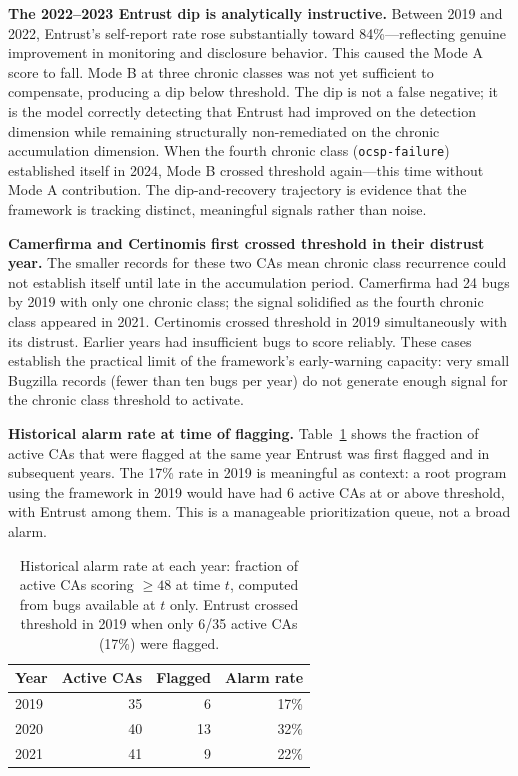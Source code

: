 \documentclass[10pt,twocolumn,letterpaper]{article}
\begin{document}
\textbf{The 2022--2023 Entrust dip is analytically instructive.} Between 2019 and 2022,
Entrust's self-report rate rose substantially toward 84\%---reflecting genuine improvement
in monitoring and disclosure behavior. This caused the Mode A score to fall. Mode B at
three chronic classes was not yet sufficient to compensate, producing a dip below threshold.
The dip is not a false negative; it is the model correctly detecting that Entrust had
improved on the detection dimension while remaining structurally non-remediated on the
chronic accumulation dimension. When the fourth chronic class (\texttt{ocsp-failure})
established itself in 2024, Mode B crossed threshold again---this time without Mode A
contribution. The dip-and-recovery trajectory is evidence that the framework is tracking
distinct, meaningful signals rather than noise.

\textbf{Camerfirma and Certinomis first crossed threshold in their distrust year.}
The smaller records for these two CAs mean chronic class recurrence could not establish
itself until late in the accumulation period. Camerfirma had 24 bugs by 2019 with only
one chronic class; the signal solidified as the fourth chronic class appeared in 2021.
Certinomis crossed threshold in 2019 simultaneously with its distrust. Earlier years
had insufficient bugs to score reliably. These cases establish the practical limit of
the framework's early-warning capacity: very small Bugzilla records (fewer than ten bugs
per year) do not generate enough signal for the chronic class threshold to activate.

\textbf{Historical alarm rate at time of flagging.} Table~\ref{tab:historical_alarm}
shows the fraction of active CAs that were flagged at the same year Entrust was first
flagged and in subsequent years. The 17\% rate in 2019 is meaningful as context: a root
program using the framework in 2019 would have had 6 active CAs at or above threshold,
with Entrust among them. This is a manageable prioritization queue, not a broad alarm.

\begin{table}[t]
\centering
\footnotesize
\setlength{\tabcolsep}{4pt}
\caption{Historical alarm rate at each year: fraction of active CAs scoring
$\geq 48$ at time $t$, computed from bugs available at $t$ only. Entrust crossed
threshold in 2019 when only 6/35 active CAs (17\%) were flagged.}
\label{tab:historical_alarm}
\begin{tabularx}{\columnwidth}{@{}Xrrr@{}}
\toprule
Year & Active CAs & Flagged & Alarm rate \\
\midrule
2019 & 35 &  6 & 17\% \\
2020 & 40 & 13 & 32\% \\
2021 & 41 &  9 & 22\% \\
\bottomrule
\end{tabularx}
\end{table}
\end{document}
